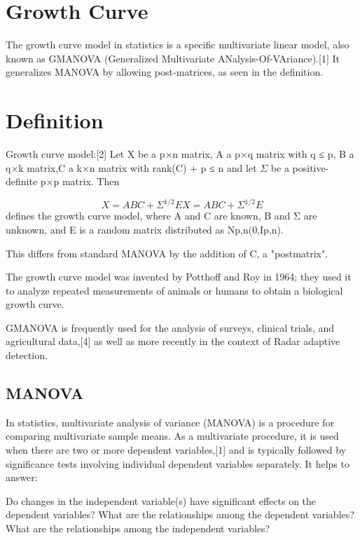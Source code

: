 
\section*{Growth Curve}
The growth curve model in statistics is a specific multivariate linear model, also known as GMANOVA (Generalized Multivariate ANalysis-Of-VAriance).[1] It generalizes MANOVA by allowing post-matrices, as seen in the definition.


\section*{Definition}
Growth curve model:[2] Let X be a p×n matrix, A a p×q matrix with q ≤ p, B a q×k matrix,C a k×n matrix with rank(C) + p ≤ n and let $\Sigma$ be a positive-definite p×p matrix. Then

\[{\displaystyle X=ABC+\Sigma ^{1/2}E} X=ABC+\Sigma^{1/2}E\]
defines the growth curve model, where A and C are known, B and Σ are unknown, and E is a random matrix distributed as Np,n(0,Ip,n).

This differs from standard MANOVA by the addition of C, a "postmatrix".

The growth curve model was invented by Potthoff and Roy in 1964; they used it to analyze repeated measurements of animals or humans to obtain a biological growth curve.

GMANOVA is frequently used for the analysis of surveys, clinical trials, and agricultural data,[4] as well as more recently in the context of Radar adaptive detection.

\subsection*{MANOVA}
In statistics, multivariate analysis of variance (MANOVA) is a procedure for comparing multivariate sample means. As a multivariate procedure, it is used when there are two or more dependent variables,[1] and is typically followed by significance tests involving individual dependent variables separately. It helps to answer:

Do changes in the independent variable(s) have significant effects on the dependent variables?
What are the relationships among the dependent variables?
What are the relationships among the independent variables?

